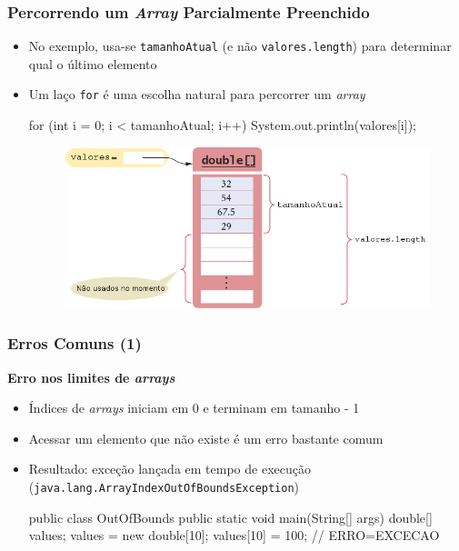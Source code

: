 \documentclass[xcolor={dvipsnames,table},aspectratio=169]{beamer}
\begin{document}
\begin{frame}[fragile]\frametitle{Percorrendo um \emph{Array} Parcialmente Preenchido}
\begin{itemize}
	\item No exemplo, usa-se \texttt{tamanhoAtual} (e não \texttt{valores.length}) para determinar qual o último elemento
	\item Um laço \texttt{for} é uma escolha natural para percorrer um \emph{array}
{\footnotesize
\begin{javacode}
for (int i = 0; i < tamanhoAtual; i++) {
  System.out.println(valores[i]);
}
\end{javacode}
}
\begin{figure}[h]
	\includegraphics[height=0.3\paperheight,center]{pucrs-ep-fprog-unidade_06-arrays-laminas-percorrendo_arrays.png}
\end{figure}
\end{itemize}
\end{frame}

\begin{frame}[fragile]\frametitle{Erros Comuns (1)}
\textbf{Erro nos limites de \emph{arrays}}
\begin{itemize}
	\item Índices de \emph{arrays} iniciam em 0 e terminam em tamanho - 1
	\item Acessar um elemento que não existe é um erro bastante comum
	\item Resultado: exceção lançada em tempo de execução (\texttt{java.lang.ArrayIndexOutOfBoundsException})
{\footnotesize
\begin{javacode}
public class OutOfBounds {
  public static void main(String[] args) {
    double[] values;
    values = new double[10];
    values[10] = 100; // ERRO=EXCECAO
  }
}
\end{javacode}
}
\end{itemize}
\end{frame}
\end{document}
